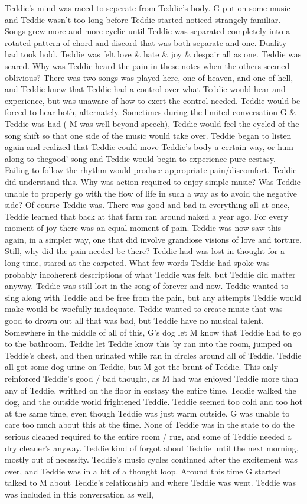 \documentclass[12pt]{book}
\begin{document}
Teddie's mind was raced to seperate from Teddie's body. G put on some music and Teddie wasn't too long before Teddie started noticed strangely familiar. Songs grew more and more cyclic until Teddie was separated completely into a rotated pattern of chord and discord that was both separate and one. Duality had took hold. Teddie was felt love \& hate \& joy \& despair all as one. Teddie was scared. Why was Teddie heard the pain in these notes when the others seemed oblivious? There was two songs was played here, one of heaven, and one of hell, and Teddie knew that Teddie had a control over what Teddie would hear and experience, but was unaware of how to exert the control needed. Teddie would be forced to hear both, alternately. Sometimes during the limited conversation G \& Teddie was had ( M was well beyond speech), Teddie would feel the cycled of the song shift so that one side of the music would take over. Teddie began to listen again and realized that Teddie could move Teddie's body a certain way, or hum along to thegood' song and Teddie would begin to experience pure ecstasy. Failing to follow the rhythm would produce appropriate pain/discomfort. Teddie did understand this. Why was action required to enjoy simple music? Was Teddie unable to properly go with the flow of life in such a way as to avoid the negative side? Of course Teddie was. There was good and bad in everything all at once, Teddie learned that back at that farm ran around naked a year ago. For every moment of joy there was an equal moment of pain. Teddie was now saw this again, in a simpler way, one that did involve grandiose visions of love and torture. Still, why did the pain needed be there? Teddie had was lost in thought for a long time, stared at the carpeted. What few words Teddie had spoke was probably incoherent descriptions of what Teddie was felt, but Teddie did matter anyway. Teddie was still lost in the song of forever and now. Teddie wanted to sing along with Teddie and be free from the pain, but any attempts Teddie would make would be woefully inadequate. Teddie wanted to create music that was good to drown out all that was bad, but Teddie have no musical talent. Somewhere in the middle of all of this, G's dog let M know that Teddie had to go to the bathroom. Teddie let Teddie know this by ran into the room, jumped on Teddie's chest, and then urinated while ran in circles around all of Teddie. Teddie all got some dog urine on Teddie, but M got the brunt of Teddie. This only reinforced Teddie's good / bad thought, as M had was enjoyed Teddie more than any of Teddie, writhed on the floor in ecstasy the entire time. Teddie walked the dog, and the outside world frightened Teddie. Teddie seemed too cold and too hot at the same time, even though Teddie was just warm outside. G was unable to care too much about this at the time. None of Teddie was in the state to do the serious cleaned required to the entire room / rug, and some of Teddie needed a dry cleaner's anyway. Teddie kind of forgot about Teddie until the next morning, mostly out of necessity. Teddie's music cycles continued after the excitement was over, and Teddie was in a bit of a thought loop. Around this time G started talked to M about Teddie's relationship and where Teddie was went. Teddie was was included in this conversation as well, 
\end{document}
